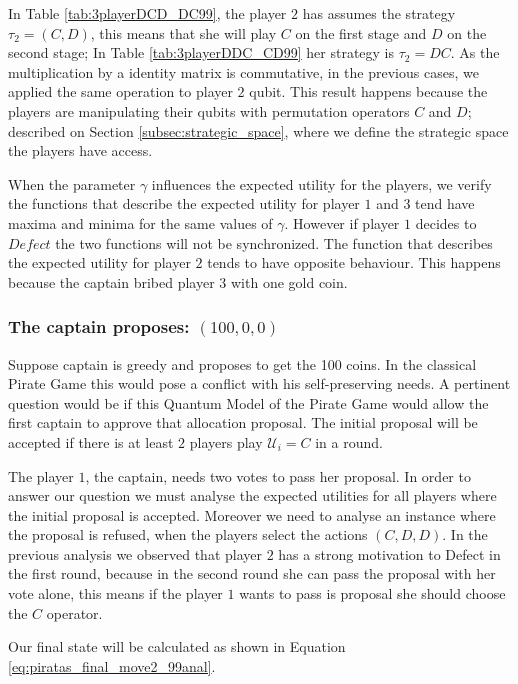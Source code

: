 In Table \ref{tab:3playerDCD_DC99}, the player $2$ has assumes the strategy $\tau_{2}=(C,D)$, this means that she will play $C$ on the first stage and $D$ on the second stage; In Table \ref{tab:3playerDDC_CD99} her strategy is $\tau_{2}=DC$. As the multiplication by a identity matrix is commutative, in the previous cases, we applied the same operation to player $2$ qubit. This result happens because the players are manipulating their qubits with permutation operators $C$ and $D$; described on Section \ref{subsec:strategic_space}, where we define the strategic space the players have access.

When the parameter $\gamma$ influences the expected utility for the players, we verify the functions that describe the expected utility for player $1$ and $3$ tend have maxima and minima for the same values of $\gamma$. However if player $1$ decides to $Defect$ the two functions will not be synchronized.
The function that describes the expected utility for player $2$ tends to have opposite behaviour. This happens because the captain bribed player $3$ with one gold coin.

\subsubsection{The captain proposes: $(100, 0, 0)$}
\label{subsubsec:3playergame100}

Suppose captain is greedy and proposes to get the 100 coins. In the classical Pirate Game this would pose a conflict with his self-preserving needs. 
A pertinent question would be if this Quantum Model of the Pirate Game would allow the first captain to approve that allocation proposal. The initial proposal will be accepted if there is at least $2$ players play $\mathcal{U}_{i}=C$ in a round. 

The player $1$, the captain, needs two votes to pass her proposal. In order to answer our question we must analyse the expected utilities for all players where the initial proposal is accepted. Moreover we need to analyse an instance where the proposal is refused, when the players select the actions $(C,D,D)$. In the previous analysis we observed that player $2$ has a strong motivation to Defect in the first round, because in the second round she can pass the proposal with her vote alone, this means if the player $1$ wants to pass is proposal she should choose the $C$ operator.

 Our final state will be calculated as shown in Equation \ref{eq:piratas_final_move2_99anal}.

